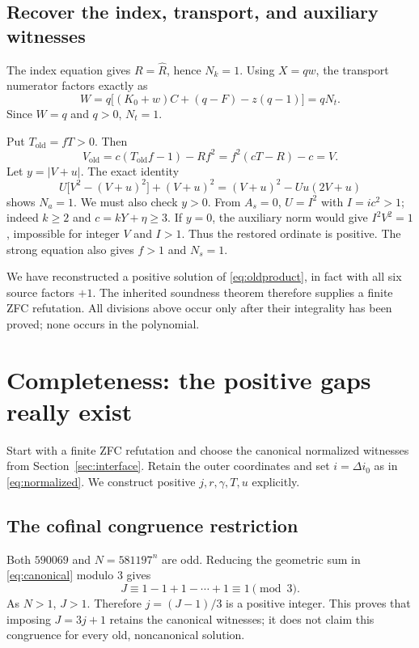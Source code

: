 \documentclass[11pt,a4paper]{article}
\theoremstyle{remark}
\newcommand{\ord}{\mathrm{old}}
\begin{document}
\subsection{Recover the index, transport, and auxiliary witnesses}

The index equation gives $R=\widehat R$, hence $N_k=1$.
Using $X=qw$, the transport numerator factors exactly as
\[
 W=q\bigl[(K_0+w)C+(q-F)-z(q-1)\bigr]=qN_t.
\]
Since $W=q$ and $q>0$, $N_t=1$.

Put $T_{\ord}=fT>0$. Then
\[
 V_{\ord}=c(T_{\ord}f-1)-Rf^2
            =f^2(cT-R)-c=V.
\]
Let $y=|V+u|$. The exact identity
\begin{equation}
 U\bigl[V^2-(V+u)^2\bigr]+(V+u)^2
       =(V+u)^2-Uu(2V+u)
 \label{eq:auxidentity}
\end{equation}
shows $N_a=1$. We must also check $y>0$. From $A_s=0$,
$U=I^2$ with $I=ic^2>1$; indeed $k\ge2$ and $c=kY+\eta\ge3$.
If $y=0$, the auxiliary norm would give $I^2V^2=1$, impossible for
integer $V$ and $I>1$. Thus the restored ordinate is positive.
The strong equation also gives $f>1$ and $N_s=1$.

We have reconstructed a positive solution of \eqref{eq:oldproduct}, in
fact with all six source factors $+1$. The inherited soundness theorem
therefore supplies a finite ZFC refutation. All divisions above occur
only after their integrality has been proved; none occurs in the polynomial.

\section{Completeness: the positive gaps really exist}
\label{sec:completeness}

Start with a finite ZFC refutation and choose the canonical normalized
witnesses from Section~\ref{sec:interface}. Retain the outer coordinates
and set $i=\Delta i_0$ as in \eqref{eq:normalized}. We construct positive
$j,r,\gamma,T,u$ explicitly.

\subsection{The cofinal congruence restriction}

Both $590069$ and $N=581197^n$ are odd. Reducing the geometric sum
in \eqref{eq:canonical} modulo $3$ gives
\[
 J\equiv 1-1+1-\cdots+1\equiv1\pmod3.
\]
As $N>1$, $J>1$. Therefore $j=(J-1)/3$ is a positive integer.
This proves that imposing $J=3j+1$ retains the canonical witnesses;
it does not claim this congruence for every old, noncanonical solution.
\end{document}
